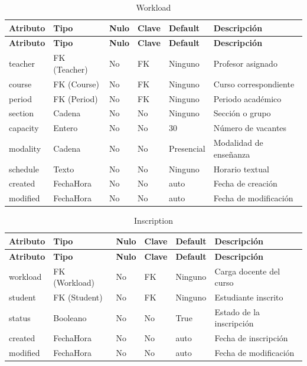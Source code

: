 \documentclass{article}
\begin{document}
\begin{longtable}{|l|l|l|l|l|l|}
\caption{Workload} \\
\hline
\rowcolor{tabledictionariesbackground}
\textbf{Atributo} & \textbf{Tipo} & \textbf{Nulo} & \textbf{Clave} & \textbf{Default} & \textbf{Descripción} \\
\hline
\endfirsthead
\hline
\rowcolor{tabledictionariesbackground}
\textbf{Atributo} & \textbf{Tipo} & \textbf{Nulo} & \textbf{Clave} & \textbf{Default} & \textbf{Descripción} \\
\hline
\endhead
teacher & FK (Teacher) & No & FK & Ninguno & Profesor asignado \\
course & FK (Course) & No & FK & Ninguno & Curso correspondiente \\
period & FK (Period) & No & FK & Ninguno & Periodo académico \\
section & Cadena & No & No & Ninguno & Sección o grupo \\
capacity & Entero & No & No & 30 & Número de vacantes \\
modality & Cadena & No & No & Presencial & Modalidad de enseñanza \\
schedule & Texto & No & No & Ninguno & Horario textual \\
created & FechaHora & No & No & auto & Fecha de creación \\
modified & FechaHora & No & No & auto & Fecha de modificación \\
\hline
\end{longtable}

\begin{longtable}{|l|l|l|l|l|l|}
\caption{Inscription} \\
\hline
\rowcolor{tabledictionariesbackground}
\textbf{Atributo} & \textbf{Tipo} & \textbf{Nulo} & \textbf{Clave} & \textbf{Default} & \textbf{Descripción} \\
\hline
\endfirsthead
\hline
\rowcolor{tabledictionariesbackground}
\textbf{Atributo} & \textbf{Tipo} & \textbf{Nulo} & \textbf{Clave} & \textbf{Default} & \textbf{Descripción} \\
\hline
\endhead
workload & FK (Workload) & No & FK & Ninguno & Carga docente del curso \\
student & FK (Student) & No & FK & Ninguno & Estudiante inscrito \\
status & Booleano & No & No & True & Estado de la inscripción \\
created & FechaHora & No & No & auto & Fecha de inscripción \\
modified & FechaHora & No & No & auto & Fecha de modificación \\
\hline
\end{longtable}
\end{document}
